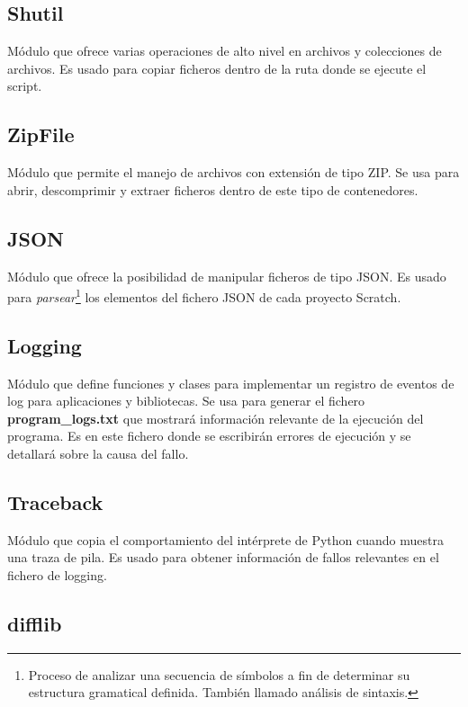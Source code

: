 \documentclass[a4paper, 12pt]{book}
\begin{document}
\subsection{Shutil}
\label{sec:shutil}

Módulo que ofrece varias operaciones de alto nivel en archivos y colecciones de archivos. Es usado para copiar ficheros dentro de la ruta donde se ejecute el script.

\subsection{ZipFile}
\label{sec:zipfile}

Módulo que permite el manejo de archivos con extensión de tipo ZIP. Se usa para abrir, descomprimir y extraer ficheros dentro de este tipo de contenedores.

\subsection{JSON}
\label{sec:jsonmodule}

Módulo que ofrece la posibilidad de manipular ficheros de tipo JSON. Es usado para \textit{parsear}\footnote{Proceso de analizar una secuencia de símbolos a fin de determinar su estructura gramatical definida. También llamado análisis de sintaxis.} los elementos del fichero JSON de cada proyecto Scratch.

\subsection{Logging}
\label{sec:logging}

Módulo que define funciones y clases para implementar un registro de eventos de log para aplicaciones y bibliotecas. Se usa para generar el fichero \textbf{program\_logs.txt} que mostrará información relevante de la ejecución del programa. Es en este fichero donde se escribirán errores de ejecución y se detallará sobre la causa del fallo.

\subsection{Traceback}
\label{sec:traceback}

Módulo que copia el comportamiento del intérprete de Python cuando muestra una traza de pila. Es usado para obtener información de fallos relevantes en el fichero de logging.

\subsection{difflib}
\label{sec:difflib}
\end{document}

